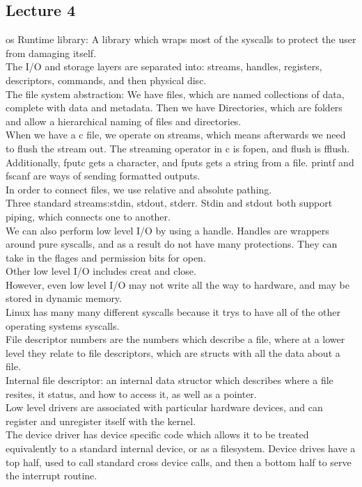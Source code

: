 \documentclass[paper=a4, fontsize=11pt]{scrartcl} %
\numberwithin{equation}{section} %
\numberwithin{figure}{section} %
\numberwithin{table}{section} %
\begin{document}
\subsection{Lecture 4}
os Runtime library: A library which wraps most of the syscalls to protect the user from damaging itself. \\
The I/O and storage layers are separated into: streams, handles, registers, descriptors, commands, and then physical disc. \\
The file system abstraction: We have files, which are named collections of data, complete with data and metadata. Then we have Directories, which are folders and allow a hierarchical naming of files and directories. \\
When we have a c file, we operate on streams, which means afterwards we need to flush the stream out. The streaming operator in c is fopen, and flush is fflush. Additionally, fputc gets a character, and fputs gets a string from a file. printf and fscanf are ways of sending formatted outputs. \\
In order to connect files, we use relative and absolute pathing. \\
Three standard streams:stdin, stdout, stderr. Stdin and stdout both support piping, which connects one to another. \\
We can also perform low level I/O by using a handle. Handles are wrappers around pure syscalls, and as a result do not have many protections. They can take in the flages and permission bits for open.\\
Other low level I/O includes creat and close. \\
However, even low level I/O may not write all the way to hardware, and may be stored in dynamic memory. \\
Linux has many many different syscalls because it trys to have all of the other operating systems syscalls. \\
File descriptor numbers are the numbers which describe a file, where at a lower level they relate to file descriptors, which are structs with all the data about a file. \\
Internal file descriptor: an internal data structor which describes where a file resites, it status, and how to access it, as well as a pointer. \\
Low level drivers are associated with particular hardware devices, and can register and unregister itself with the kernel. \\
The device driver has device specific code which allows it to be treated equivalently to a standard internal device, or as a filesystem. Device drives have a top half, used to call standard cross device calls, and then a bottom half to serve the interrupt routine. \\
\end{document}
